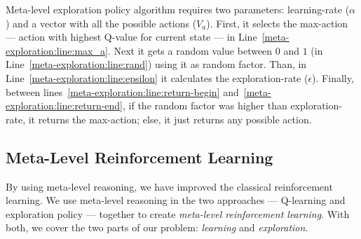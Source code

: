 Meta-level exploration policy algorithm requires two parameters: learning-rate ($\alpha$) and a vector with all the possible actions ($V_a$).
First, it selects the max-action --- action with highest Q-value for current state --- in Line~\ref{meta-exploration:line:max_a}.
Next it gets a random value between $0$ and $1$ (in Line~\ref{meta-exploration:line:rand}) using it as random factor.
Than, in Line~\ref{meta-exploration:line:epsilon} it calculates the exploration-rate ($\epsilon$).
Finally, between lines~\ref{meta-exploration:line:return-begin} and~\ref{meta-exploration:line:return-end}, if the random factor was higher than exploration-rate, it returns the max-action; else, it just returns any possible action.



\subsection{Meta-Level Reinforcement Learning}
\label{subsec:mlrl}

By using meta-level reasoning, we have improved the classical reinforcement learning.
We use meta-level reasoning in the two approaches --- Q-learning and exploration policy --- together to create \textit{meta-level reinforcement learning}.
With both, we cover the two parts of our problem: \textit{learning} and \textit{exploration}.